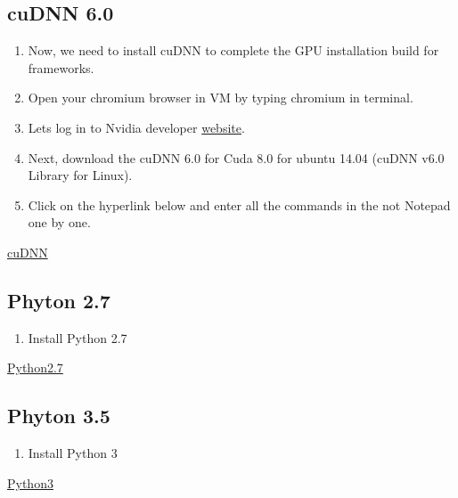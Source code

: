 \documentclass[12pt]{article}
\begin{document}
\subsection{cuDNN 6.0}

\begin{enumerate}[resume]
  \item Now, we need to install cuDNN to complete the GPU installation build for frameworks.
  \item Open your chromium browser in VM by typing chromium in terminal.
  \item Lets log in to Nvidia developer  \href{https://developer.nvidia.com/rdp/cudnn-download}{website}.
  \item Next, download the cuDNN 6.0 for Cuda 8.0 for ubuntu 14.04 (cuDNN v6.0 Library for Linux).
  \item Click on the hyperlink below and enter all the commands in the not Notepad one by one.
\end{enumerate}

\begin{center}
\href{run:./Text_Files_14/cuDNN.txt}{\Large cuDNN}
\end{center}

\subsection{Phyton 2.7}

\begin{enumerate}[resume]
  \item Install Python 2.7
\end{enumerate}

\begin{center}
\href{run:./Text_Files_14/Python2.txt}{\Large Python2.7}
\end{center}

\subsection{Phyton 3.5}

\begin{enumerate}[resume]
  \item Install Python 3
\end{enumerate}

\begin{center}
\href{run:./Text_Files_14/Python3.txt}{\Large Python3}
\end{center}
\end{document}
